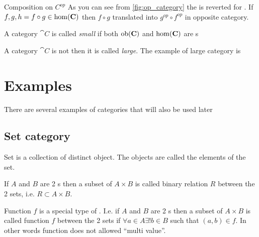 \begin{remark}{Composition on $C^{op}$}
\label{rem:op_composition}
As you can see from \cref{fig:op_category} the
 is reverted for
. If $f,g,h = f \circ g \in
\mathrm{hom}(\mathbf{C})$ then $f \circ g$ translated into $g^{op} \circ
f^{op}$ in opposite category.
\end{remark}

\begin{definition}
\label{def:small_category}
A category $\cat{C}$ is called \textit{small} if both $\mathrm{ob}(\mathbf{C})$ and
$\mathrm{hom}(\mathbf{C})$ are s
\end{definition}

\begin{definition}
\label{def:large_category}
A category $\cat{C}$ is not  then it is
called \textit{large}. The example of large category is
\end{definition}

\section{Examples}

There are several examples of categories that will also be used later

\subsection{\textbf{Set} category}

\begin{definition}[Set]
  \label{def:set}
  Set is a collection of distinct object. The objects are called the
  elements of the set.
\end{definition}

\begin{definition}
  \label{def:binary_relation}
  If $A$ and $B$ are 2 s then a subset of $A \times B$ is
  called binary relation $R$ between the 2 sets, i.e. $R \subset A \times B$.
\end{definition}

\begin{definition}[Function]
  \label{def:function}
  Function $f$ is a special type of . I.e.
  if $A$ and $B$ are 2 s then a subset of $A \times B$ is
  called function $f$ between the 2 sets if $\forall a \in A \exists!
  b \in B$ such that $(a,b) \in f$. In other words function does not
  allowed ``multi value''.
\end{definition}


